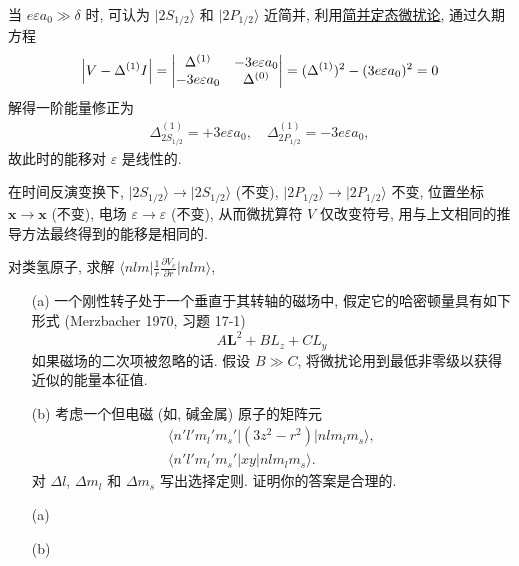 \documentclass{assignment}
\begin{document}
\begin{sol}
    当 $e\varepsilon a_0\gg\delta$ 时, 可认为 $\lvert 2S_{1/2}\rangle$ 和 $\lvert 2P_{1/2}\rangle$ 近简并, 利用\uline{简并定态微扰论}, 通过久期方程
    \begin{align}
        \left\lvert V-\Delta^{(1)}I\right\rvert=\begin{vmatrix}
            \Delta^{(1)}&-3e\varepsilon a_0\\
            -3e\varepsilon a_0&\Delta^{(0)}
        \end{vmatrix}=(\Delta^{(1)})^2-(3e\varepsilon a_0)^2=0
    \end{align}
    解得一阶能量修正为
    \begin{align}
        \Delta_{2S_{1/2}}^{(1)}=+3e\varepsilon a_0,\quad\Delta_{2P_{1/2}}^{(1)}=-3e\varepsilon a_0,
    \end{align}
    故此时的能移对 $\varepsilon$ 是线性的.

    在时间反演变换下, $\lvert 2S_{1/2}\rangle\rightarrow\lvert 2S_{1/2}\rangle$ (不变), $\lvert 2P_{1/2}\rangle\rightarrow\lvert 2P_{1/2}\rangle$ 不变, 位置坐标 $\bm{x}\rightarrow\bm{x}$ (不变), 电场 $\varepsilon\rightarrow\varepsilon$ (不变), 从而微扰算符 $V$ 仅改变符号, 用与上文相同的推导方法最终得到的能移是相同的.
\end{sol}

\begin{prob}[补充习题]
    对类氢原子, 求解 $\langle nlm\rvert\frac{1}{r}\frac{\partial V_c}{\partial r}\lvert nlm\rangle$,
\end{prob}
\begin{sol}
    
\end{sol}

\begin{prob}[课本习题 5.17]
    \begin{itemize}
        \item[(a)] 一个刚性转子处于一个垂直于其转轴的磁场中, 假定它的哈密顿量具有如下形式 (Merzbacher 1970, 习题 17-1)
        \[
            A\bm{L}^2+BL_z+CL_y
        \]
        如果磁场的二次项被忽略的话. 假设 $B\gg C$, 将微扰论用到最低非零级以获得近似的能量本征值.
        \item[(b)] 考虑一个但电磁 (如, 碱金属) 原子的矩阵元
        \begin{gather*}
            \langle n'l'm_l'm_s'\rvert(3z^2-r^2)\lvert nlm_lm_s\rangle,\\
            \langle n'l'm_l'm_s'\rvert xy\lvert nlm_lm_s\rangle.
        \end{gather*}
        对 $\Delta l$, $\Delta m_l$ 和 $\Delta m_s$ 写出选择定则. 证明你的答案是合理的.
    \end{itemize}
\end{prob}
\begin{sol}
    \begin{itemize}
        \item[(a)] 
        \item[(b)] 
    \end{itemize}
\end{sol}
\end{document}
